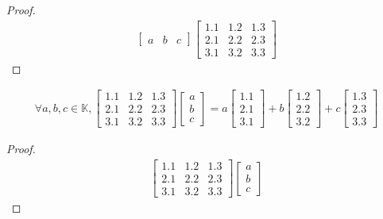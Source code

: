 \begin{proof}
	\begin{align*}
		\begin{bmatrix*}
			a & b & c
		\end{bmatrix*}
		\begin{bmatrix*}
			1.1 & 1.2 & 1.3\\
			2.1 & 2.2 & 2.3\\
			3.1 & 3.2 & 3.3
		\end{bmatrix*}
	\end{align*}
\end{proof}


\begin{proposicao}\label{prop:tema-1-ex5-2}
	\begin{align*}
		\forall a, b, c \in \mathbb{K},
		\begin{bmatrix*}
			1.1 & 1.2 & 1.3\\
			2.1 & 2.2 & 2.3\\
			3.1 & 3.2 & 3.3
		\end{bmatrix*}
		\begin{bmatrix*}
			a\\
			b\\
			c
		\end{bmatrix*}
		=
		a
		\begin{bmatrix*}
			1.1\\
			2.1\\
			3.1
		\end{bmatrix*}
		+
		b
		\begin{bmatrix*}
			1.2\\
			2.2\\
			3.2
		\end{bmatrix*}
		+
		c
		\begin{bmatrix*}
			1.3\\
			2.3\\
			3.3
		\end{bmatrix*}
	\end{align*}
\end{proposicao}

\begin{proof}
	\begin{align*}
		\begin{bmatrix*}
			1.1 & 1.2 & 1.3\\
			2.1 & 2.2 & 2.3\\
			3.1 & 3.2 & 3.3
		\end{bmatrix*}
		\begin{bmatrix*}
			a\\
			b\\
			c
		\end{bmatrix*}
	\end{align*}
\end{proof}



